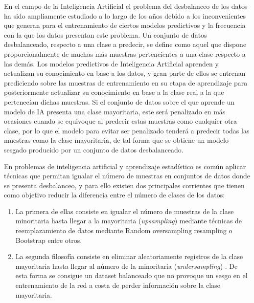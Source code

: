 \documentclass{uathesis-es}
\begin{document}

En el campo de la Inteligencia Artificial el problema del desbalanceo de los datos ha sido ampliamente estudiado a lo largo de los años debido a los inconvenientes que generan para el entrenamiento de ciertos modelos predictivos y la frecuencia con la que los datos presentan este problema. Un conjunto de datos desbalanceado, respecto a una clase a predecir, se define como aquel que dispone proporcionalmente de muchas más muestras pertencientes a una clase respecto a las demás. Los modelos predictivos de Inteligencia Artificial aprenden y actualizan su conocimiento en base a los datos, y gran parte de ellos se entrenan prediciendo sobre las muestras de entrenamiento en su etapa de aprendizaje para posteriormente actualizar su conocimiento en base a la clase real a la que pertenecían dichas muestras. Si el conjunto de datos sobre el que aprende un modelo de IA presenta una clase mayoritaria, este será penalizado en más ocasiones cuando se equivoque al predecir estas muestras como cualquier otra clase, por lo que el modelo para evitar ser penalizado tenderá a predecir todas las muestras como la clase mayoritaria, de tal forma que se obtiene un modelo sesgado producido por un conjunto de datos desbalanceado.

En problemas de inteligencia artificial y aprendizaje estadístico es común aplicar técnicas que permitan igualar el número de muestras en conjuntos de datos donde se presenta desbalanceo, y para ello existen dos principales corrientes que tienen como objetivo reducir la diferencia entre el número de clases de los datos:

\begin{enumerate}
    \item La primera de ellas consiste en igualar el número de muestras de la clase minoritaria hasta llegar a la mayoritaria (\textit{upsampling}) mediante técnicas de reemplazamiento de datos mediante Random oversampling resampling \cite{abdi2015combat} o Bootstrap \cite{zoubir2007bootstrap} entre otros.
    \item La segunda filosofía consiste en eliminar aleatoriamente registros de la clase mayoritaria hasta llegar al número de la minoritaria (\textit{undersampling}) \cite{mohammed2020machine}. De esta forma se consigue un dataset balanceado que no provoque un sesgo en el entrenamiento de la red a costa de perder información sobre la clase mayoritaria.
\end{enumerate}
\end{document}
